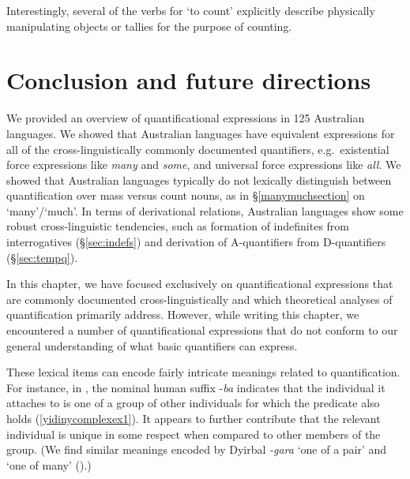 \documentclass[12pt,egregdoesnotlikesansseriftitles]{scrartcl}
\begin{document}
Interestingly, several of the verbs for `to count' explicitly describe physically manipulating objects or tallies for the purpose of counting. %

\section{Conclusion and future directions}

We provided an overview of quantificational expressions in 125 Australian languages. We showed that Australian languages have equivalent expressions for all of the cross-linguistically commonly documented quantifiers, e.g.\ existential force expressions like \textit{many} and \textit{some}, and universal force expressions like \textit{all}. We showed that Australian languages typically do not lexically distinguish between quantification over mass versus count nouns, as in \S\ref{manymuchsection} on `many'/`much'. %
In terms of derivational relations, Australian languages show some  robust cross-linguistic tendencies, such as formation of indefinites from interrogatives (\S\ref{sec:indefs}) and derivation of A-quantifiers from D-quantifiers (\S\ref{sec:tempq}).

In this chapter, we have focused exclusively on quantificational expressions that are commonly documented cross-linguistically and which theoretical analyses of quantification primarily address. However, while writing this chapter, we encountered a number of quantificational expressions that do not conform to our general understanding of what basic quantifiers can express. 

These lexical items can encode fairly intricate meanings related to quantification. For instance, in  {}, the nominal human suffix -\textit{ba} indicates that the individual it attaches to is one of a group of other individuals for which the predicate also holds (\ref{yidinycomplexex1}). It appears to further contribute that the relevant individual is unique in some respect when compared to other members of the group. (We find similar meanings encoded by Dyirbal \textit{-gara} `one of a pair' and {} `one of many' (\citealt[230--231]{dixon72}).)

\end{document}
